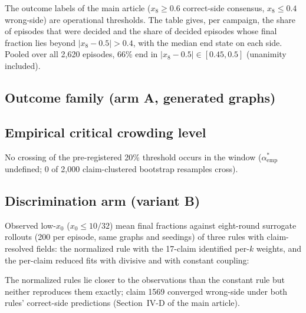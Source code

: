 \documentclass[11pt]{article}
\newcommand{\astar}{\alpha^{*}}
\begin{document}
The outcome labels of the main article ($x_8 \ge 0.6$ correct-side consensus,
$x_8 \le 0.4$ wrong-side) are operational thresholds. The table gives, per
campaign, the share of episodes that were decided and the share of decided
episodes whose final fraction lies beyond $|x_8 - 0.5| > 0.4$, with the
median end state on each side. Pooled over all 2{,}620 episodes, 66\% end in
$|x_8 - 0.5| \in [0.45, 0.5]$ (unanimity included).
\begin{center}
\small
\resizebox{\textwidth}{!}{}
\end{center}

\subsection{Outcome family (arm A, generated graphs)}
\begin{center}
\small

\end{center}

\subsection{Empirical critical crowding level}
\begin{center}

\end{center}
No crossing of the pre-registered 20\% threshold occurs in the window
($\astar_{\mathrm{emp}}$ undefined; 0 of 2{,}000 claim-clustered bootstrap
resamples cross).

\subsection{Discrimination arm (variant B)}
\begin{center}

\end{center}

Observed low-$x_0$ ($x_0 \le 10/32$) mean final fractions against eight-round
surrogate rollouts (200 per episode, same graphs and seedings) of three rules
with claim-resolved fields: the normalized rule with the 17-claim identified
per-$k$ weights, and the per-claim reduced fits with divisive and with
constant coupling:
\begin{center}
\small
\resizebox{\textwidth}{!}{}
\end{center}
The normalized rules lie closer to the observations than the constant rule
but neither reproduces them exactly; claim 1569 converged wrong-side under
both rules' correct-side predictions (Section~IV-D of the main article).
\end{document}

